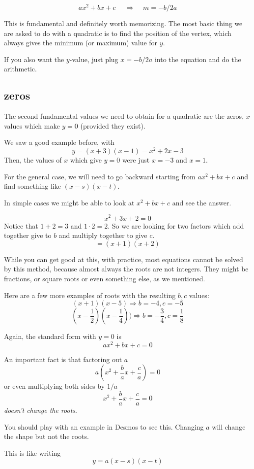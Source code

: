 \documentclass[11pt, oneside]{article}
\begin{document}
\[ ax^2 + bx + c  \ \ \ \ \ \ \Rightarrow  \ \ \ \ \ m = -b/2a \]

This is fundamental and definitely worth memorizing.  The most basic thing we are asked to do with a quadratic is to find the position of the vertex, which always gives the minimum (or maximum) value for $y$.

If you also want the $y$-value, just plug $x = -b/2a$ into the equation and do the arithmetic.

\subsection*{zeros}
The second fundamental values we need to obtain for a quadratic are the zeros, $x$ values which make $y = 0$ (provided they exist).

We saw a good example before, with
\[ y = (x + 3)(x - 1) = x^2 + 2x - 3 \]
Then, the values of $x$ which give $y = 0$ were just $x = -3$ and $x = 1$.  

For the general case, we will need to go backward starting from $ax^2 + bx + c$ and find something like $(x - s)(x - t)$.  

In simple cases we might be able to look at $x^2 + bx + c$ and see the answer.

\[ x^2 + 3x + 2 = 0 \]
Notice that $1 + 2 = 3$ and $1 \cdot 2 = 2$.  So we are looking for two factors which add together give to $b$ and multiply together to give $c$.
\[ = (x + 1)(x + 2) \]

While you can get good at this, with practice, most equations cannot be solved by this method, because almost always the roots are not integers.  They might be fractions, or square roots or even something else, as we mentioned.

Here are a few more examples of roots with the resulting $b,c$ values:
\[ (x + 1)(x - 5) \Rightarrow b = -4, c = -5 \]
\[ (x - \frac{1}{2})(x - \frac{1}{4})) \Rightarrow b = - \frac{3}{4}, c = \frac{1}{8} \]

Again, the standard form with $y = 0$ is
\[ ax^2 + bx + c = 0 \]

An important fact is that factoring out $a$
\[ a(x^2 + \frac{b}{a} x + \frac{c}{a}) = 0 \]
or even multiplying both sides by $1/a$
\[ x^2 + \frac{b}{a} x + \frac{c}{a} = 0 \]
\emph{doesn't change the roots}.

You should play with an example in Desmos to see this.  Changing $a$ will change the shape but not the roots.

This is like writing
\[ y = a(x - s)(x - t) \]
\end{document}
